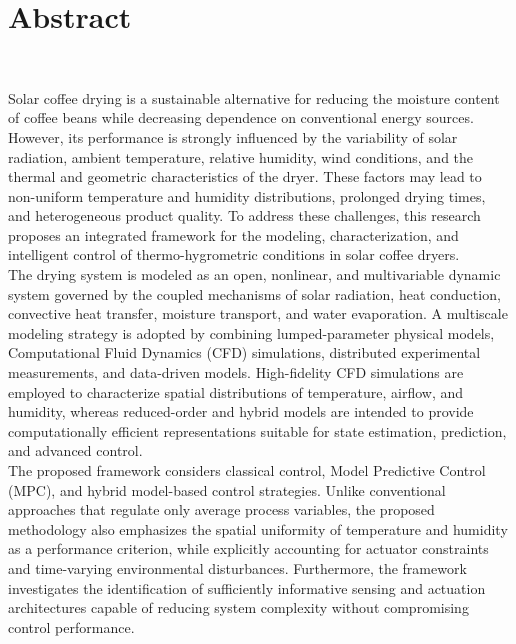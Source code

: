 \chapter*{Abstract}
~\newline~\newline~

Solar coffee drying is a sustainable alternative for reducing the moisture content of coffee beans while decreasing dependence on conventional energy sources. However, its performance is strongly influenced by the variability of solar radiation, ambient temperature, relative humidity, wind conditions, and the thermal and geometric characteristics of the dryer. These factors may lead to non-uniform temperature and humidity distributions, prolonged drying times, and heterogeneous product quality. To address these challenges, this research proposes an integrated framework for the modeling, characterization, and intelligent control of thermo-hygrometric conditions in solar coffee dryers.\\

The drying system is modeled as an open, nonlinear, and multivariable dynamic system governed by the coupled mechanisms of solar radiation, heat conduction, convective heat transfer, moisture transport, and water evaporation. A multiscale modeling strategy is adopted by combining lumped-parameter physical models, Computational Fluid Dynamics (CFD) simulations, distributed experimental measurements, and data-driven models. High-fidelity CFD simulations are employed to characterize spatial distributions of temperature, airflow, and humidity, whereas reduced-order and hybrid models are intended to provide computationally efficient representations suitable for state estimation, prediction, and advanced control.\\

The proposed framework considers classical control, Model Predictive Control (MPC), and hybrid model-based control strategies. Unlike conventional approaches that regulate only average process variables, the proposed methodology also emphasizes the spatial uniformity of temperature and humidity as a performance criterion, while explicitly accounting for actuator constraints and time-varying environmental disturbances. Furthermore, the framework investigates the identification of sufficiently informative sensing and actuation architectures capable of reducing system complexity without compromising control performance.\\

